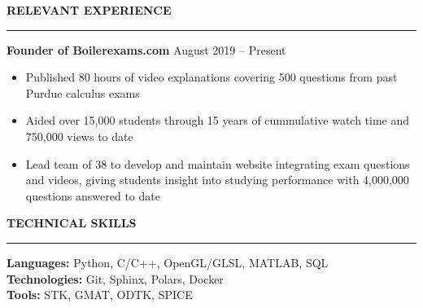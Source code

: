 \documentclass[11pt, a4paper]{article}
\newcommand{\sectiontitle}[1]{{\Large \textbf{#1}}\vspace{0.5em}\hrule\vspace{0.5em}}
\begin{document}
\sectiontitle{RELEVANT EXPERIENCE}
\textbf{Founder of Boilerexams.com} \hfill August 2019 -- Present
\begin{itemize}[noitemsep]
    \item Published 80 hours of video explanations covering 500 questions from past Purdue calculus exams
    \item Aided over 15,000 students through 15 years of cummulative watch time and 750,000 views to date
    \item Lead team of 38 to develop and maintain website integrating exam questions and videos, giving students
    insight into studying performance with 4,000,000 questions answered to date
\end{itemize}

\sectiontitle{TECHNICAL SKILLS}
\textbf{Languages:} Python, C/C++, OpenGL/GLSL, MATLAB, SQL \\
\textbf{Technologies:} Git, Sphinx, Polars, Docker \\
\textbf{Tools:} STK, GMAT, ODTK, SPICE \\
\end{document}

